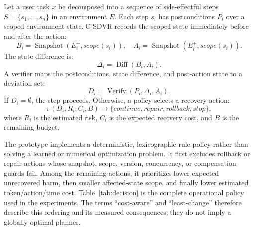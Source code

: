 \documentclass[pdflatex,sn-apa]{sn-jnl}
\begin{document}
Let a user task $x$ be decomposed into a sequence of side-effectful steps $S=\{s_1,\ldots,s_n\}$ in an environment $E$. Each step $s_i$ has postconditions $P_i$ over a scoped environment state. C-SDVR records the scoped state immediately before and after the action:
\begin{equation}
  B_i = \operatorname{Snapshot}(E_i^{-}, scope(s_i)), \quad
  A_i = \operatorname{Snapshot}(E_i^{+}, scope(s_i)).
\end{equation}
The state difference is:
\begin{equation}
  \Delta_i = \operatorname{Diff}(B_i, A_i).
\end{equation}
A verifier maps the postconditions, state difference, and post-action state to a deviation set:
\begin{equation}
  D_i = \operatorname{Verify}(P_i, \Delta_i, A_i).
\end{equation}
If $D_i=\emptyset$, the step proceeds. Otherwise, a policy selects a recovery action:
\begin{equation}
  \pi(D_i, R_i, C_i, B) \rightarrow \{\textit{continue}, \textit{repair}, \textit{rollback}, \textit{stop}\},
\end{equation}
where $R_i$ is the estimated risk, $C_i$ is the expected recovery cost, and $B$ is the remaining budget.

The prototype implements a deterministic, lexicographic rule policy rather than solving a learned or numerical optimization problem. It first excludes rollback or repair actions whose snapshot, scope, version, concurrency, or compensation guards fail. Among the remaining actions, it prioritizes lower expected unrecovered harm, then smaller affected-state scope, and finally lower estimated token/action/time cost. Table~\ref{tab:decision} is the complete operational policy used in the experiments. The terms ``cost-aware'' and ``least-change'' therefore describe this ordering and its measured consequences; they do not imply a globally optimal planner.
\end{document}
